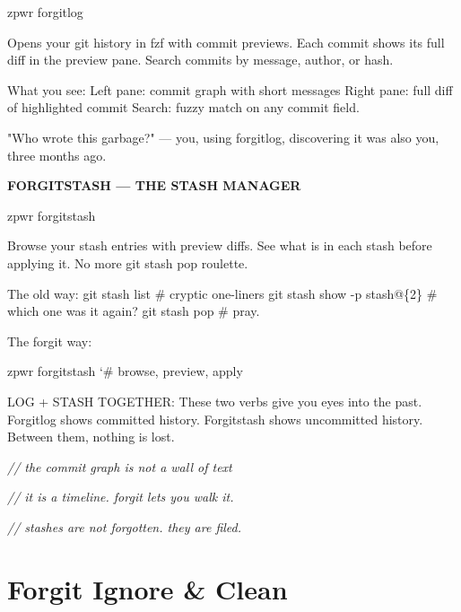 \documentclass[11pt,a4paper,twoside]{book}
\begin{document}
\begin{codebox}
\color{neongreen}zpwr forgitlog\\
\end{codebox}

Opens your git history in fzf with commit previews. Each commit shows its full diff in the preview pane. Search commits by message, author, or hash.

What you see: Left pane:  commit graph with short messages Right pane: full diff of highlighted commit Search:     fuzzy match on any commit field.

"Who wrote this garbage?" — you, using forgitlog, discovering it was also you, three months ago.


\vspace{12pt}
{\bfseries\color{neonyellow} FORGITSTASH — THE STASH MANAGER}\vspace{4pt}

\begin{codebox}
\color{neongreen}zpwr forgitstash\\
\end{codebox}

Browse your stash entries with preview diffs. See what is in each stash before applying it. No more git stash pop roulette.

The old way: git stash list              \# cryptic one-liners git stash show -p stash@\{2\}  \# which one was it again? git stash pop               \# pray.

The forgit way:

\begin{codebox}
\color{neongreen}zpwr forgitstash            {\char`\#} browse, preview, apply\\
\end{codebox}

LOG + STASH TOGETHER: These two verbs give you eyes into the past. Forgitlog shows committed history. Forgitstash shows uncommitted history. Between them, nothing is lost.

{\small\itshape\color{dimtext} // the commit graph is not a wall of text}

{\small\itshape\color{dimtext} // it is a timeline. forgit lets you walk it.}

{\small\itshape\color{dimtext} // stashes are not forgotten. they are filed.}


\vspace{16pt}

\section{Forgit Ignore \& Clean}
\end{document}
